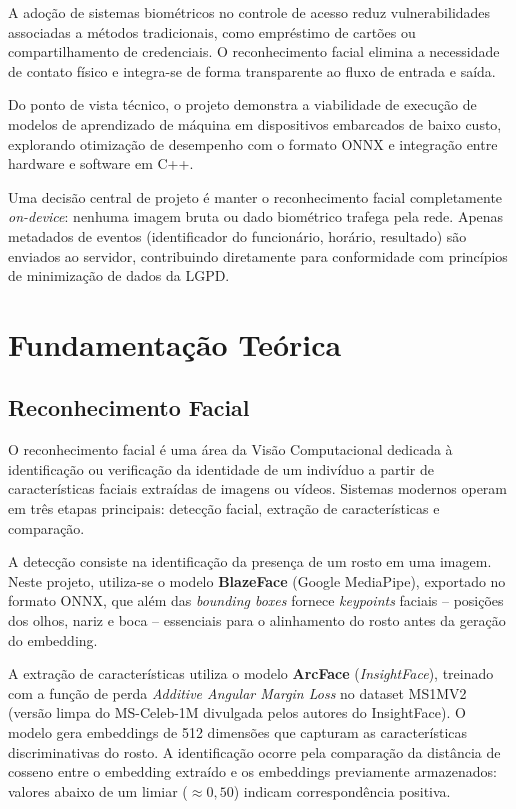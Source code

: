 \documentclass[12pt,a4paper]{report}
\begin{document}
A adoção de sistemas biométricos no controle de acesso reduz vulnerabilidades associadas a métodos tradicionais, como empréstimo de cartões ou compartilhamento de credenciais. O reconhecimento facial elimina a necessidade de contato físico e integra-se de forma transparente ao fluxo de entrada e saída.

Do ponto de vista técnico, o projeto demonstra a viabilidade de execução de modelos de aprendizado de máquina em dispositivos embarcados de baixo custo, explorando otimização de desempenho com o formato ONNX e integração entre hardware e software em C++.

Uma decisão central de projeto é manter o reconhecimento facial completamente \textit{on-device}: nenhuma imagem bruta ou dado biométrico trafega pela rede. Apenas metadados de eventos (identificador do funcionário, horário, resultado) são enviados ao servidor, contribuindo diretamente para conformidade com princípios de minimização de dados da LGPD.

\chapter{Fundamentação Teórica}

\section{Reconhecimento Facial}

O reconhecimento facial é uma área da Visão Computacional dedicada à identificação ou verificação da identidade de um indivíduo a partir de características faciais extraídas de imagens ou vídeos. Sistemas modernos operam em três etapas principais: detecção facial, extração de características e comparação.

A detecção consiste na identificação da presença de um rosto em uma imagem. Neste projeto, utiliza-se o modelo \textbf{BlazeFace} (Google MediaPipe), exportado no formato ONNX, que além das \textit{bounding boxes} fornece \textit{keypoints} faciais -- posições dos olhos, nariz e boca -- essenciais para o alinhamento do rosto antes da geração do embedding.

A extração de características utiliza o modelo \textbf{ArcFace} (\textit{InsightFace}), treinado com a função de perda \textit{Additive Angular Margin Loss} no dataset MS1MV2 (versão limpa do MS-Celeb-1M divulgada pelos autores do InsightFace). O modelo gera embeddings de 512 dimensões que capturam as características discriminativas do rosto. A identificação ocorre pela comparação da distância de cosseno entre o embedding extraído e os embeddings previamente armazenados: valores abaixo de um limiar ($\approx 0{,}50$) indicam correspondência positiva.
\end{document}
